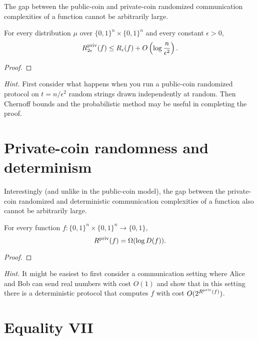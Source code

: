 The gap between the public-coin and private-coin randomized communication complexities of a function cannot be arbitrarily large. 

\begin{theorem}
For every distribution $\mu$ over $\{0,1\}^n \times \{0,1\}^n$ and every constant $\epsilon > 0$,
\[
R^{\mathrm{priv}}_{2\epsilon}(f) \le R_\epsilon(f) + O\left(\log \frac{n}{\epsilon^2}\right).
\]
\end{theorem}

\begin{proof}
\end{proof}

\bigskip
\begin{remark}
\emph{Hint.} First consider what happens when you run a public-coin randomized protocol on $t = n/\epsilon^2$ random strings drawn independently at random. Then Chernoff bounds and the probabilistic method may be useful in completing the proof.
\end{remark}


\newpage 
\section{Private-coin randomness and determinism}

Interestingly (and unlike in the public-coin model), the gap between the private-coin randomized and deterministic communication complexities of a function also cannot be arbitrarily large. 

\begin{theorem}
For every function $f : \{0,1\}^n \times \{0,1\}^n \to \{0,1\}$,
\[
R^{\mathrm{priv}}(f) = \Omega( \log D(f)).
\]
\end{theorem}

\begin{proof}
\end{proof}

\bigskip
\begin{remark}
\emph{Hint.} It might be easiest to first consider a communication setting where Alice and Bob can send real numbers with cost $O(1)$ and show that in this setting there is a deterministic protocol that computes $f$ with cost $O(2^{R^{\mathrm{priv}}(f)})$.
\end{remark}

\newpage 
\section{Equality VII}

